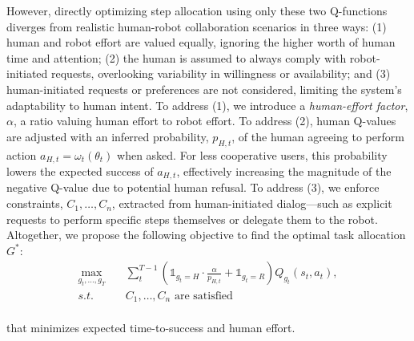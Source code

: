 
However, directly optimizing step allocation using only these two Q-functions diverges from realistic human-robot collaboration scenarios in three ways:
(1) human and robot effort are valued equally, ignoring the higher worth of human time and attention;
(2) the human is assumed to always comply with robot-initiated requests, overlooking variability in willingness or availability; and
(3) human-initiated requests or preferences are not considered, limiting the system’s adaptability to human intent.
To address (1), we introduce a \textit{human-effort factor}, $\alpha$, a ratio valuing human effort to robot effort. %
To address (2), human Q-values are adjusted with an inferred probability, $p_{H,t}$, of the human agreeing to perform action $a_{H,t} = \omega_t(\theta_t)$ when asked.
For less cooperative users, this probability lowers the expected success of $a_{H, t}$, effectively increasing the magnitude of the negative Q-value due to potential human refusal. To address (3), we enforce constraints, $C_1,\ldots,C_n$, extracted from human-initiated dialog—such as explicit requests to perform specific steps themselves or delegate them to the robot.
Altogether, we propose the following objective to find the optimal task allocation $G^*$:
\begin{equation}
\label{eqn:objective}
\begin{aligned}
\max_{g_t, ..., g_T} \quad & \sum_{t}^{T-1} \left( \mathds{1}_{g_t = H} \cdot \frac{\alpha}{p_{H, t}} + \mathds{1}_{g_t = R} \right) Q_{g_t}(s_t, a_t),\\
{s.t.} \quad & C_1, \ldots, C_n \text{ are satisfied}\\
\end{aligned}
\end{equation}

that minimizes expected time-to-success and human effort.


